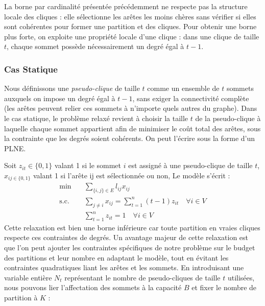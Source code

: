 \documentclass{article}
\begin{document}
La borne par cardinalité présentée précédemment ne respecte pas la structure locale des cliques : elle sélectionne les arêtes les moins chères sans vérifier si elles sont cohérentes pour former une partition et des cliques. Pour obtenir une borne plus forte, on exploite une propriété locale d'une clique : dans une clique de taille $t$, chaque sommet possède nécessairement un degré égal à $t-1$.

\subsubsection*{Cas Statique} 
Nous définissons une \textit{pseudo-clique} de taille $t$ comme un ensemble de $t$ sommets auxquels on impose un degré égal à $t-1$, sans exiger la connectivité complète (les arêtes peuvent relier ces sommets à n'importe quels autres du graphe).
Dans le cas statique, le problème relaxé revient à choisir la taille $t$ de la pseudo-clique à laquelle chaque sommet appartient afin de minimiser le coût total des arêtes, sous la contrainte que les degrés soient cohérents.
On peut l'écrire sous la forme d'un PLNE.

Soit $z_{it} \in \{0,1\}$ valant 1 si le sommet $i$ est assigné à une pseudo-clique de taille $t$, $x_{ij \in \{0,1\}}$ valant 1 si l'arête ij est sélectionnée ou non,  Le modèle s'écrit :
\begin{align*}
    \min \quad & \sum_{\{i,j\} \in E} l_{ij} x_{ij} \\
    \text{s.c.} \quad & \sum_{j \neq i} x_{ij} = \sum_{t=1}^n (t-1) z_{it} \quad \forall i \in V \\
    & \sum_{t=1}^n z_{it} = 1 \quad \forall i \in V
\end{align*}
Cette relaxation est bien une borne inférieure car toute partition en vraies cliques respecte ces contraintes de degrés.
Un avantage majeur de cette relaxation est que l'on peut ajouter les contraintes spécifiques de notre problème sur le budget des partitions et leur nombre en adaptant le modèle, tout en évitant les contraintes quadratiques liant les arêtes et les sommets. En introduisant une variable entière $N_t$ représentant le nombre de pseudo-cliques de taille $t$ utilisées, nous pouvons lier l'affectation des sommets à la capacité $B$ et fixer le nombre de partition à $K$ :
\end{document}
